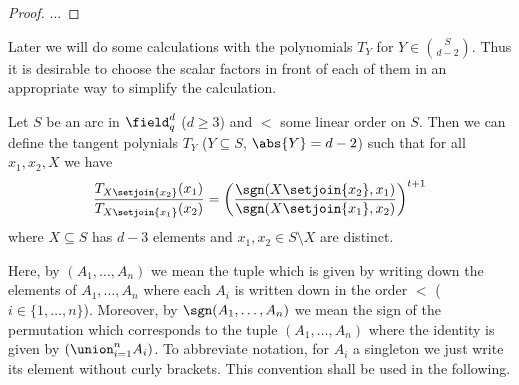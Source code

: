 \message{ !name(OnTheRAIDProblem.tex)}\documentclass[8pt,a4paper]{article}
\begin{document}
\begin{proof}
... 
\end{proof}

Later we will do some calculations with the polynomials $T_Y$ for $Y\in\binom{S}{d-2}$. Thus it is desirable to choose the scalar factors in front of each of them in an appropriate way to simplify the calculation.

\begin{lemma}
Let $S$ be an arc in $\field_q^d$ ($d\geq 3$) and $<$ some linear
order on $S$. Then we can define the tangent polynials $T_Y$
($Y\subseteq S$, $\abs{Y}=d-2$) such that for all $x_1,x_2,X$ we have
\begin{equation}
\frac{T_{X\setjoin\{x_2\}}(x_1)}{T_{X\setjoin\{x_1\}}(x_2)}=\left(\frac{\sgn(X\setjoin\{x_2\},x_1)}{\sgn(X\setjoin\{x_1\},x_2)}\right)^{t+1}
\end{equation}
where $X\subseteq S$ has $d-3$ elements and $x_1,x_2\in S\setminus X$ are distinct.
\end{lemma}

\begin{remark}
Here, by $(A_1,\ldots,A_n)$ we mean the tuple
which is given by writing down the elements of $A_1,\ldots,A_n$
where each $A_i$ is written down in the order $<$
($i\in\{1,\ldots,n\}$). Moreover, by $\sgn(A_1,\ldots,A_n)$ we mean
the sign of the permutation which corresponds to the tuple $(A_1,\ldots,A_n)$
where the identity is given by $(\union_{i=1}^n{A_i})$. To abbreviate notation, for $A_i$ a singleton we just write its
element without curly brackets.  
This convention shall be used in the following.
\end{remark}
\end{document}
